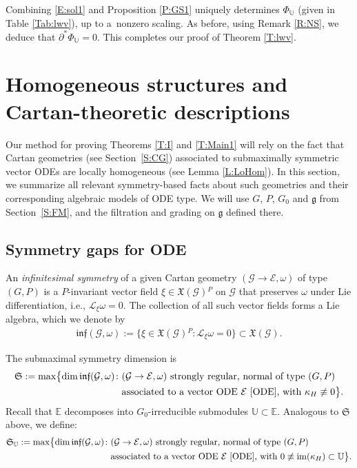 \documentclass[10pt,a4paper]{amsart}
\DeclareMathOperator{\img}{im}
\newcommand\cL{\mathcal{L}}
\newcommand{\g}{\mathfrak{g}}
\newcommand\cG{\mathcal{G}}
\newcommand\finf{\mathfrak{inf}}
\newcommand\fS{\mathfrak{S}}
\newcommand\fX {\mathfrak{X}}
\newcommand\bbE{\mathbb{E}}
\newcommand\bbU{\mathbb{U}}
\newcommand\cE{\mathcal{E}}
\numberwithin{equation}{section}
\begin{document}
 Combining \eqref{E:sol1} and Proposition \ref{P:GS1} uniquely determines $\Phi_{\bbU}$ (given in Table \ref{Tab:lwv}), up to a~nonzero scaling. As before, using Remark \ref{R:NS}, we deduce that $\partial^* \Phi_{\bbU} = 0$. This completes our proof of Theorem \ref{T:lwv}.


\section{Homogeneous structures and Cartan-theoretic descriptions} \label{S:Hom}

 Our method for proving Theorems \ref{T:I} and \ref{T:Main1} will rely on the fact that Cartan geometries (see Section~\ref{S:CG}) associated to submaximally symmetric vector ODEs are locally homogeneous (see Lemma \ref{L:LoHom}). In this section, we summarize all relevant symmetry-based facts about such geometries and their corresponding algebraic models of ODE type. We will use $G$, $P$, $G_0$ and $\g$ from Section~\ref{S:FM}, and the filtration and grading on $\g$ defined there.

\subsection{Symmetry gaps for ODE} \label{S:TPA}

An {\em infinitesimal symmetry} of a given Cartan geometry $(\cG \to \cE, \omega)$ of type $(G, P)$ is a $P$-invariant vector field $\xi \in \fX(\cG){}^P$ on $\cG$ that preserves $\omega$ under Lie differentiation, i.e., $\cL_\xi \omega = 0$. The collection of all such vector fields forms a Lie algebra, which we denote by
\begin{align*}
\finf(\cG, \omega) := \bigl\{\xi \in \fX(\cG){}^P\colon \cL_\xi \omega = 0\bigr\} \subset \fX(\cG).
\end{align*}

The submaximal symmetry dimension is
\begin{align*}%
\begin{split}
\fS := \max \bigl\{\dim \finf(\cG, \omega)\colon& (\cG \to \cE, \omega) \ \text{strongly regular, normal of type} \ (G,P) \\
& \text{associated to a vector ODE $\cE$ \eqref{ODE}, with} \ \kappa_H \not \equiv 0 \bigr \}.
\end{split}
\end{align*}
Recall that $\bbE$ decomposes into $G_0$-irreducible submodules $\bbU \subset \bbE$. Analogous to $\fS$ above, we define:
\begin{align*}
\begin{split}
\fS_\bbU := \max \bigl\{\dim \finf(\cG, \omega)\colon& (\cG \to \cE, \omega) \
 \text{strongly regular, normal of type}\ (G,P) \\
& \text{associated to a vector ODE $\cE$ \eqref{ODE},} \ \text{with} \ 0 \not \equiv \img(\kappa_H) \subset \bbU \bigr\}.
\end{split}
\end{align*}
\end{document}
